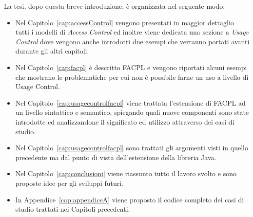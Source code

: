 La tesi, dopo questa breve introduzione, è organizzata nel seguente modo: 
\begin{itemize}
\item Nel Capitolo~\ref{cap:accessControl} vengono
presentati in maggior dettaglio tutti i modelli di \textit{Access Control} ed inoltre viene dedicata una sezione a \textit{Usage Control}
dove vengono anche introdotti due esempi che verranno portati avanti
durante gli altri capitoli.
\item Nel Capitolo~\ref{cap:facpl} è descritto \ac{FACPL} e vengono riportati alcuni esempi che mostrano le problematiche per cui non è possibile farne un uso a livello di Usage Control.
\item Nel Capitolo~\ref{cap:usagecontrolfacpl} viene trattata l’estensione di \ac{FACPL} ad un livello sintattico
e semantico, spiegando quali nuove componenti sono state introdotte ed
analizzandone il significato ed utilizzo attraverso dei casi di studio.
\item Nel Capitolo~\ref{cap:usagecontrolfacpl} sono trattati gli argomenti
visti in quello precedente ma dal punto di vista dell’estensione della
libreria Java.
\item Nel Capitolo~\ref{cap:conclusioni} viene riassunto tutto il lavoro svolto e sono proposte idee per gli sviluppi futuri.

\item In Appendice~\ref{cap:appendiceA} viene proposto il codice completo dei casi di studio trattati nei Capitoli precedenti.
\end{itemize}
